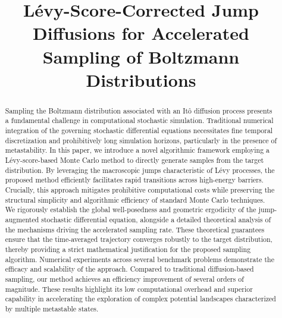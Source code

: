\documentclass[11pt]{article}
\begin{document}
\title{L\'{e}vy-Score-Corrected Jump Diffusions for Accelerated Sampling of Boltzmann Distributions}
\author{}
\date{}
\maketitle

\begin{abstract}
Sampling the Boltzmann distribution associated with an It\^{o} diffusion process presents a fundamental challenge in computational stochastic simulation. Traditional numerical integration of the governing stochastic differential equations necessitates fine temporal discretization and prohibitively long simulation horizons, particularly in the presence of metastability. In this paper, we introduce a novel algorithmic framework employing a L\'{e}vy-score-based Monte Carlo method to directly generate samples from the target distribution. By leveraging the macroscopic jumps characteristic of L\'{e}vy processes, the proposed method efficiently facilitates rapid transitions across high-energy barriers. Crucially, this approach mitigates prohibitive computational costs while preserving the structural simplicity and algorithmic efficiency of standard Monte Carlo techniques. We rigorously establish the global well-posedness and geometric ergodicity of the jump-augmented stochastic differential equation, alongside a detailed theoretical analysis of the mechanisms driving the accelerated sampling rate. These theoretical guarantees ensure that the time-averaged trajectory converges robustly to the target distribution, thereby providing a strict mathematical justification for the proposed sampling algorithm. Numerical experiments across several benchmark problems demonstrate the efficacy and scalability of the approach. Compared to traditional diffusion-based sampling, our method achieves an efficiency improvement of several orders of magnitude. These results highlight its low computational overhead and superior capability in accelerating the exploration of complex potential landscapes characterized by multiple metastable states.
\end{abstract}




 








 

\end{document}
